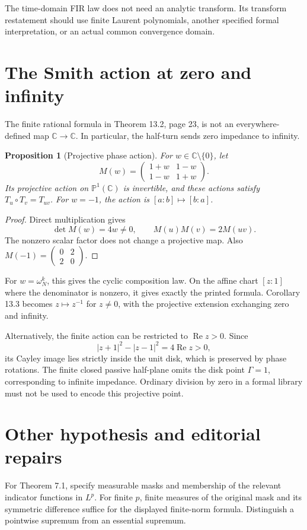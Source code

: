 \documentclass[11pt]{article}
\newtheorem{proposition}{Proposition}
\newcommand{\C}{\mathbb C}
\begin{document}
The time-domain FIR law does not need an analytic transform. Its transform restatement should use finite Laurent polynomials, another specified formal interpretation, or an actual common convergence domain.

\section{The Smith action at zero and infinity}
The finite rational formula in Theorem 13.2, page 23, is not an everywhere-defined map $\C\to\C$. In particular, the half-turn sends zero impedance to infinity.

\begin{proposition}[Projective phase action]
For $w\in\C\setminus\{0\}$, let
\[
M(w)=\begin{pmatrix}1+w&1-w\\1-w&1+w\end{pmatrix}.
\]
Its projective action on $\mathbb P^1(\C)$ is invertible, and these actions satisfy $T_u\circ T_v=T_{uv}$. For $w=-1$, the action is $[a:b]\mapsto[b:a]$.
\end{proposition}
\begin{proof}
Direct multiplication gives
\[
\det M(w)=4w\ne0,\qquad M(u)M(v)=2M(uv).
\]
The nonzero scalar factor does not change a projective map. Also
$M(-1)=\left(\begin{smallmatrix}0&2\\2&0\end{smallmatrix}\right)$.
\end{proof}
For $w=\omega_N^k$, this gives the cyclic composition law. On the affine chart $[z:1]$ where the denominator is nonzero, it gives exactly the printed formula. Corollary 13.3 becomes $z\mapsto z^{-1}$ for $z\ne0$, with the projective extension exchanging zero and infinity.

Alternatively, the finite action can be restricted to $\operatorname{Re}z>0$. Since
\[
|z+1|^2-|z-1|^2=4\operatorname{Re}z>0,
\]
its Cayley image lies strictly inside the unit disk, which is preserved by phase rotations. The finite closed passive half-plane omits the disk point $\Gamma=1$, corresponding to infinite impedance. Ordinary division by zero in a formal library must not be used to encode this projective point.

\section{Other hypothesis and editorial repairs}
For Theorem 7.1, specify measurable masks and membership of the relevant indicator functions in $L^p$. For finite $p$, finite measures of the original mask and its symmetric difference suffice for the displayed finite-norm formula. Distinguish a pointwise supremum from an essential supremum.
\end{document}
